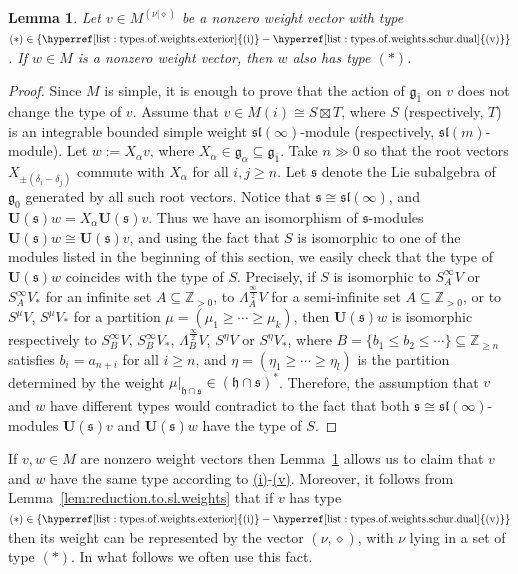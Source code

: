 \documentclass[12pt]{amsart}
\newcommand\Z{\mathbb{Z}}
\newcommand\g{\mathfrak{g}}
\newcommand\fs{\mathfrak{s}}
\newcommand\fh{\mathfrak{h}}
\newcommand\fsl{\mathfrak{sl}}
\newcommand\bU{\mathbf{U}}
\theoremstyle{plain}
\newtheorem{lem}[theo]{Lemma}
\theoremstyle{definition}
\numberwithin{equation}{section}
\begin{document}
\begin{lem}\label{lem:components.same.type}
Let $v\in M^{(\nu|\diamond)}$ be a nonzero weight vector with type  $(*) \in \{\rm \hyperref[list:types.of.weights.exterior]{(i)} \rm - \hyperref[list:types.of.weights.schur.dual]{(v)}\}$. If $w\in M$ is a nonzero weight vector, then $w$ also has type $(*)$.
\end{lem}
\begin{proof}
Since $M$ is simple, it is enough to prove that the action of $\g_{\bar 1}$ on $v$ does not change the type of $v$. Assume that $v\in M(i)\cong S\boxtimes T$, where $S$ (respectively, $T$) is an integrable bounded simple weight $\fsl(\infty)$-module (respectively, $\fsl(m)$-module). Let $w := X_{\alpha}v$, where $X_{\alpha} \in \g_\alpha\subseteq \g_{\bar 1}$. Take $n\gg 0$ so that the root vectors $X_{\pm (\delta_i - \delta_j)}$ commute with $X_\alpha$ for all $i,j\geq n$. Let $\fs$ denote the Lie subalgebra of $\g_0$ generated by all such root vectors. Notice that $\fs \cong \fsl(\infty)$, and $\bU(\fs)w = X_\alpha \bU(\fs)v$. Thus we have an isomorphism of $\fs$-modules $\bU(\fs)w\cong \bU(\fs)v$, and using the fact that $S$ is isomorphic to one of the modules listed in the beginning of this section, we easily check that the type of $\bU(\fs)w$ coincides with the type of $S$. Precisely, if $S$ is isomorphic to $S_A^\infty V$ or $S_A^\infty V_*$ for an infinite set $A\subseteq \Z_{>0}$, to $ \Lambda_A^{\frac{\infty}{2}} V$ for a semi-infinite set $A\subseteq \Z_{>0}$, or to $S^\mu V$, $S^\mu V_*$ for a partition $\mu = (\mu_1\geq \cdots \geq \mu_k)$, then $\bU(\fs)w$ is isomorphic respectively to $S_B^\infty V$, $S_B^\infty V_*$, $\Lambda_B^{\frac{\infty}{2}} V$, $S^\eta V$ or $S^\eta V_*$, where $B = \{b_1\leq b_2\leq \cdots\}\subseteq \Z_{\geq n}$ satisfies $b_i = a_{n+i}$ for all $i\geq n$, and $\eta = (\eta_1\geq \cdots \geq \eta_l)$ is the partition determined by the weight $\mu|_{\fh\cap \fs}\in (\fh\cap \fs)^*$. Therefore, the assumption that $v$ and $w$ have different types would contradict to the fact that both $\fs \cong \fsl(\infty)$-modules $\bU(\fs)v$ and $\bU(\fs)w$ have the type of $S$.
\end{proof}


If $v, w\in M$ are nonzero weight vectors then Lemma~\ref{lem:components.same.type} allows us to claim that $v$ and $w$ have the same type according to \hyperref[list:types.of.weights.exterior]{(i)}-\hyperref[list:types.of.weights.schur.dual]{(v)}. Moreover, it follows from Lemma~\ref{lem:reduction.to.sl.weights} that if $v$ has type $(*) \in {\rm \{\hyperref[list:types.of.weights.exterior]{(i)}-\hyperref[list:types.of.weights.schur.dual]{(v)}\}}$ then its weight can be represented by the vector $(\nu, \diamond)$, with $\nu$ lying in a set of type $(*)$. In what follows we often use this fact.
\end{document}
